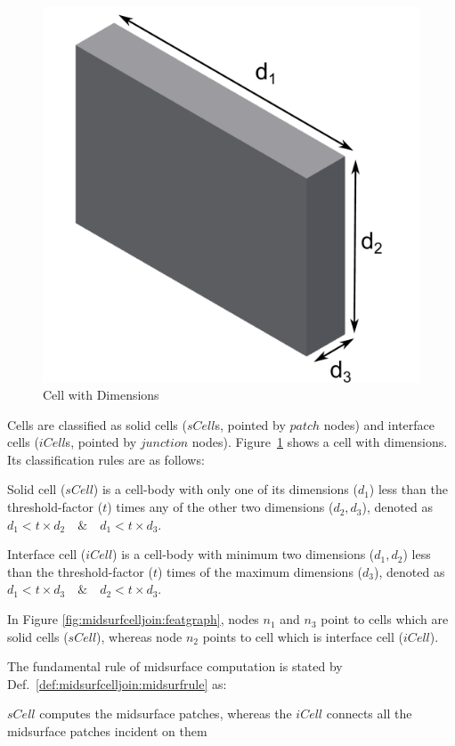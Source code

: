  \begin{figure}[!h]
\centering     %
\includegraphics[width=0.3\linewidth,valign=t]{../Common/images/InventorCell.pdf}
\caption{Cell with Dimensions}
\label{fig:litsurvey:celldim}
\end{figure}

Cells are classified as solid cells ($sCell$s, pointed by $patch$ nodes) and interface cells ($iCell$s, pointed by $junction$ nodes). Figure~\ref{fig:litsurvey:celldim} shows a cell with dimensions. Its classification rules are as follows:







\begin{mydef}
\label{def:midsurfcelljoin:scell}
Solid cell ($sCell$) is a cell-body with only one of its dimensions ($d_1$) less than the threshold-factor ($t$) times any of the other two dimensions ($d_2, d_3$), denoted as  $d_1 < t \times d_2 \quad \&  \quad d_1 < t \times d_3$. %
\end{mydef}
\begin{mydef}
\label{def:midsurfcelljoin:icell}
Interface cell ($iCell$) is a cell-body with minimum two dimensions ($d_1,d_2$) less than the threshold-factor ($t$) times of the maximum dimensions ($d_3$), denoted as  $d_1 < t \times d_3 \quad \&  \quad d_2 < t  \times d_3$. %
\end{mydef}


In Figure \ref{fig:midsurfcelljoin:featgraph}, nodes $n_1$ and $n_3$ point to cells which are solid cells ($sCell$), whereas node $n_2$ points to cell which is interface cell ($iCell$).  

The fundamental rule of midsurface computation is stated by Def.~\ref{def:midsurfcelljoin:midsurfrule} as:

\begin{mydef}
\label{def:midsurfcelljoin:midsurfrule}
$sCell$ computes the midsurface patches, whereas the  $iCell$ connects all the midsurface patches incident on them
\end{mydef}			

